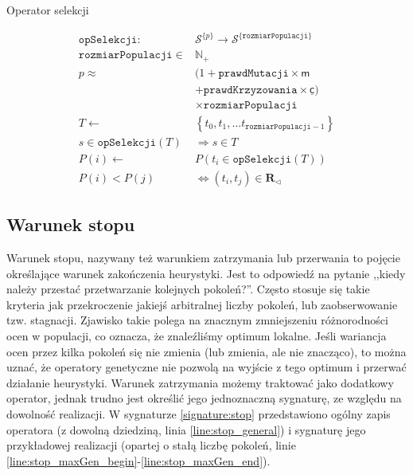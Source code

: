 \documentclass[twoside]{iisthesis}
\newcommand{\numberSet}[1]{\mathbb{#1}}
\newcommand{\important}[1]{\mathcal{#1}}
\newcommand{\R}{\mathbf{R}}
\newcommand{\minoritySpecimenRel}{{\R}_{\lhd}}
\newcommand{\param}[1]{\mathtt{#1}}
\newcommand{\variable}[1]{\mathsf{#1}}
\newcommand{\outputVar}[1]{\variable{\underline{#1}}}
\newcommand{\withSize}[2]{{#1}^{ \{ #2 \}}}
\begin{document}
\begin{signature}
	\caption{Operator selekcji \label{signature:selection}}
	\begin{align}
	\param{opSelekcji}: &\withSize{\important{S}}{p} \rightarrow \withSize{\important{S}}{\param{rozmiarPopulacji}} \\
	\param{rozmiarPopulacji} \in &\numberSet{N}_{+} \\
	\label{line:p_start} 
	p \approx &(1 + \param{prawdMutacji} \times \variable{m} \\
	          &+ \param{prawdKrzyzowania} \times \outputVar{c}) \\
	\label{line:p_stop} 
	&\times \param{rozmiarPopulacji} \\
	\label{line:constraint_sel_start}          
	T \gets &\left\{ t_0, t_1, \ldots t_{\param{rozmiarPopulacji}-1} \right\} \\
	s \in \param{opSelekcji}(T) &\Rightarrow s \in T\\
	P(i) \gets &P(t_i \in \param{opSelekcji}(T)) \\
	\label{line:constraint_sel_stop} 
	P(i) < P(j) &\Leftrightarrow (t_i, t_j) \in \minoritySpecimenRel
	\end{align}
\end{signature}

\subsection{Warunek stopu} \label{subsection:stop}

Warunek stopu, nazywany też warunkiem zatrzymania lub przerwania to pojęcie określające warunek zakończenia heurystyki. Jest to odpowiedź na pytanie ,,kiedy należy przestać przetwarzanie kolejnych pokoleń?''. Często stosuje się takie kryteria jak przekroczenie jakiejś arbitralnej liczby pokoleń, lub zaobserwowanie tzw. stagnacji. Zjawisko takie polega na znacznym zmniejszeniu różnorodności ocen w populacji, co oznacza, że znaleźliśmy optimum lokalne. Jeśli wariancja ocen przez kilka pokoleń się nie zmienia (lub zmienia, ale nie znacząco), to można uznać, że operatory genetyczne nie pozwolą na wyjście z tego optimum i przerwać działanie heurystyki. 
Warunek zatrzymania możemy traktować jako dodatkowy operator, jednak trudno jest określić jego jednoznaczną sygnaturę, ze względu na dowolność realizacji. W sygnaturze \ref{signature:stop} przedstawiono ogólny zapis operatora (z dowolną dziedziną, linia \ref{line:stop_general}) i sygnaturę jego przykładowej realizacji (opartej o stałą liczbę pokoleń, linie \ref{line:stop_maxGen_begin}-\ref{line:stop_maxGen_end}).
\end{document}
